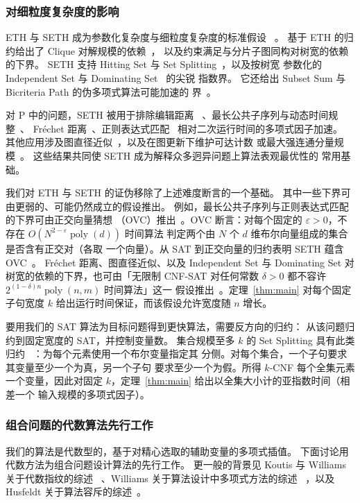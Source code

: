 \documentclass[11pt,reqno]{amsart}
\numberwithin{equation}{section}
\theoremstyle{definition}\newtheorem{definition}[theorem]{定义}
\theoremstyle{remark}\newtheorem{remark}[theorem]{注}
\newcommand{\poly}{\operatorname{poly}}
\begin{document}
\subsubsection{对细粒度复杂度的影响}\label{subsec:related-consequences}
ETH 与 SETH 成为参数化复杂度与细粒度复杂度的标准假设
~\cite{IPZ,VW19}。
基于 ETH 的归约给出了 Clique 对解规模的依赖~\cite{CHKX06}，
以及约束满足与分片子图同构对树宽的依赖~\cite{Marx10} 的下界。
SETH 支持 Hitting Set 与 Set Splitting~\cite{CDL16}，以及按树宽
参数化的 Independent Set 与 Dominating Set~\cite{LMS18} 的尖锐
指数界。
它还给出 Subset Sum 与 Bicriteria Path 的伪多项式算法可能加速的
界~\cite{ABHS19}。

对 $\mathrm P$ 中的问题，SETH 被用于排除编辑距离
~\cite{BackursIndyk18}、最长公共子序列与动态时间规整~\cite{BK15}、
Fr\'echet 距离~\cite{Bri14}、正则表达式匹配~\cite{BI16}
相对二次运行时间的多项式因子加速。
其他应用涉及图直径近似~\cite{RV13}，以及在图更新下维护可达计数
或最大强连通分量规模~\cite{AW14}。
这些结果共同使 SETH 成为解释众多迥异问题上算法表观最优性的
常用基础。

我们对 ETH 与 SETH 的证伪移除了上述难度断言的一个基础。
其中一些下界可由更弱的、可能仍然成立的假设推出。
例如，最长公共子序列与正则表达式匹配的下界可由正交向量猜想
（OVC）推出~\cite{BK15,BI16}。OVC 断言：对每个固定的
$\varepsilon>0$，不存在 $O(N^{2-\varepsilon}\poly(d))$ 时间算法
判定两个由 $N$ 个 $d$ 维布尔向量组成的集合是否含有正交对（各取
一个向量）。从 SAT 到正交向量的归约表明 SETH 蕴含
OVC~\cite{Wil05,VW19}。
Fr\'echet 距离、图直径近似、以及 Independent Set 与 Dominating
Set 对树宽的依赖的下界，也可由「无限制 CNF-SAT 对任何常数
$\delta>0$ 都不容许 $2^{(1-\delta)n}\poly(n,m)$ 时间算法」这一
假设推出~\cite{Bri14,RV13,LMS18}。定理~\ref{thm:main} 对每个固定
子句宽度 $k$ 给出运行时间保证，而该假设允许宽度随 $n$ 增长。

要用我们的 SAT 算法为目标问题得到更快算法，需要反方向的归约：
从该问题归约到固定宽度的 SAT，并控制变量数。
集合规模至多 $k$ 的 Set Splitting 具有此类归约
~\cite[Observation~3.6]{CDL16}：为每个元素使用一个布尔变量指定其
分侧。对每个集合，一个子句要求其变量至少一个为真，另一个子句
要求至少一个为假。所得 $k$-CNF 每个全集元素一个变量，因此对固定
$k$，定理~\ref{thm:main} 给出以全集大小计的亚指数时间（相差一个
输入规模的多项式因子）。

\subsubsection{组合问题的代数算法先行工作}\label{subsec:related-algebraic}
我们的算法是代数型的，基于对精心选取的辅助变量的多项式插值。
下面讨论用代数方法为组合问题设计算法的先行工作。
更一般的背景见 Koutis 与 Williams 关于代数指纹的综述
~\cite{KW16}、Williams 关于算法设计中多项式方法的综述
~\cite{Wil14}，以及 Husfeldt 关于算法容斥的综述~\cite{Hus11}。
\end{document}
